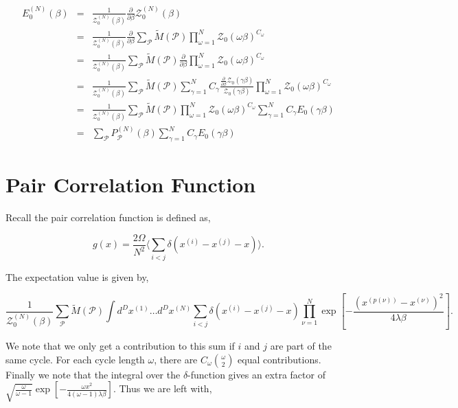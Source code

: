 \documentclass[aps,preprint,showpacs,superscriptaddress,groupedaddress]{revtex4}  %
\begin{document}
\begin{eqnarray}
  E_{0}^{(N)}(\beta) &=& \frac{1}{\mathcal{Z}_{0}^{(N)}(\beta)} \frac{\partial}{\partial\beta} \mathcal{Z}_{0}^{(N)}(\beta) \\
                     &=& \frac{1}{\mathcal{Z}_{0}^{(N)}(\beta)} \frac{\partial}{\partial\beta} \sum_{\mathcal{P}} \tilde{M}(\mathcal{P}) \prod_{\omega=1}^{N} \mathcal{Z}_{0}(\omega\beta)^{C_{\omega}} \\
                     &=& \frac{1}{\mathcal{Z}_{0}^{(N)}(\beta)} \sum_{\mathcal{P}} \tilde{M}(\mathcal{P}) \frac{\partial}{\partial\beta} \prod_{\omega=1}^{N} \mathcal{Z}_{0}(\omega\beta)^{C_{\omega}} \\
                     &=& \frac{1}{\mathcal{Z}_{0}^{(N)}(\beta)} \sum_{\mathcal{P}} \tilde{M}(\mathcal{P}) \sum_{\gamma=1}^{N} C_{\gamma} \frac{\frac{\partial}{\partial\beta}\mathcal{Z}_{0}(\gamma\beta)}{\mathcal{Z}_{0}(\gamma\beta)} \prod_{\omega=1}^{N} \mathcal{Z}_{0}(\omega\beta)^{C_{\omega}} \\
                     &=& \frac{1}{\mathcal{Z}_{0}^{(N)}(\beta)} \sum_{\mathcal{P}} \tilde{M}(\mathcal{P}) \prod_{\omega=1}^{N} \mathcal{Z}_{0}(\omega\beta)^{C_{\omega}} \sum_{\gamma=1}^{N} C_{\gamma} E_{0}(\gamma\beta) \\
                     &=& \sum_{\mathcal{P}} P_{\mathcal{P}}^{(N)}(\beta) \sum_{\gamma=1}^{N} C_{\gamma} E_{0}(\gamma\beta)
\end{eqnarray}

\section{Pair Correlation Function}

Recall the pair correlation function is defined as,

\begin{equation}
  g(x) = \frac{2 \Omega}{N^{2}} \langle \sum_{i<j} \delta(x^{(i)}-x^{(j)}-x) \rangle.
\end{equation}

The expectation value is given by,

\begin{equation}
  \frac{1}{\mathcal{Z}_{0}^{(N)}(\beta)} \sum_{\mathcal{P}} \tilde{M}(\mathcal{P}) \int d^{D}x^{(1)} \dots d^{D}x^{(N)} \sum_{i<j} \delta(x^{(i)}-x^{(j)}-x) \prod_{\nu=1}^{N} \exp{[-\frac{(x^{(p(\nu))}-x^{(\nu)})^{2}}{4\lambda\beta}]}.
\end{equation}

We note that we only get a contribution to this sum if $i$ and $j$ are part of the same cycle. For each cycle length $\omega$, there are $C_{\omega} \binom{\omega}{2}$ equal contributions. Finally we note that the integral over the $\delta$-function gives an extra factor of $\sqrt{\frac{\omega}{\omega-1}}\exp{[-\frac{\omega x^{2}}{4(\omega-1)\lambda\beta}]}$. Thus we are left with,
\end{document}
